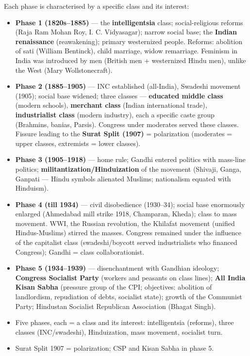 Each phase is characterised by a specific class and its interest:
\begin{itemize}
\item \textbf{Phase 1 (1820s--1885)} --- the \textbf{intelligentsia} class; social-religious reforms (Raja Ram Mohan Roy, I. C. Vidyasagar); narrow social base; the \textbf{Indian renaissance} (reawakening); primary westernized people. Reforms: abolition of sati (William Bentinck), child marriage, widow remarriage. Feminism in India was introduced by men (British men + westernized Hindu men), unlike the West (Mary Wollstonecraft).
\item \textbf{Phase 2 (1885--1905)} --- INC established (all-India), Swadeshi movement (1905); social base widened; three classes --- \textbf{educated middle class} (modern schools), \textbf{merchant class} (Indian international trade), \textbf{industrialist class} (modern industry), each a specific caste group (Brahmins, banias, Parsis). Congress under moderates served these classes. Fissure leading to the \textbf{Surat Split (1907)} = polarization (moderates = upper classes, extremists = lower classes).
\item \textbf{Phase 3 (1905--1918)} --- home rule; Gandhi entered politics with mass-line politics; \textbf{militantization/Hinduization} of the movement (Shivaji, Ganga, Ganpati --- Hindu symbols alienated Muslims; nationalism equated with Hinduism).
\item \textbf{Phase 4 (till 1934)} --- civil disobedience (1930--34); social base enormously enlarged (Ahmedabad mill strike 1918, Champaran, Kheda); class to mass movement. WWI, the Russian revolution, the Khilafat movement (unified Hindus-Muslims) stirred the masses. Congress remained under the influence of the capitalist class (swadeshi/boycott served industrialists who financed Congress); Gandhi = class collaborationist.
\item \textbf{Phase 5 (1934--1939)} --- disenchantment with Gandhian ideology; \textbf{Congress Socialist Party} (workers and peasants on class lines); \textbf{All India Kisan Sabha} (pressure group of the CPI; objectives: abolition of landlordism, repudiation of debts, socialist state); growth of the Communist Party; Hindustan Socialist Republican Association (Bhagat Singh).
\end{itemize}

\begin{QuickRevision}
\begin{itemize}
\item Five phases, each = a class and its interest: intelligentsia (reforms), three classes (INC/swadeshi), Hinduization, mass movement, socialist turn.
\item Surat Split 1907 = polarization; CSP and Kisan Sabha in phase 5.
\end{itemize}
\end{QuickRevision}

